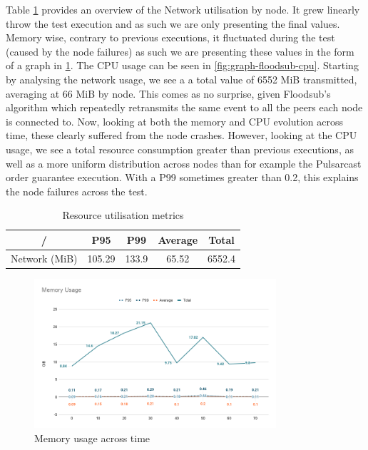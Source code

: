 Table \ref{table:floodsub} provides an overview of the Network utilisation by
node. It grew linearly throw the test execution and as such we are only
presenting the final values. Memory wise, contrary to previous executions, it
fluctuated during the test (caused by the node failures) as such we are
presenting these values in the form of a graph in
\ref{fig:graph-floodsub-memory}. The CPU usage can be seen in
\ref{fig:graph-floodsub-cpu}. Starting by analysing the network usage, we see a
a total value of 6552 MiB transmitted, averaging at 66 MiB by node. This comes
as no surprise, given Floodsub's algorithm which repeatedly retransmits the
same event to all the peers each node is connected to. Now, looking at both the
memory and CPU evolution across time, these clearly suffered from the node
crashes. However, looking at the CPU usage, we see a total resource consumption
greater than previous executions, as well as a more uniform distribution across
nodes than for example the Pulsarcast order guarantee execution. With a P99
sometimes greater than 0.2, this explains the node failures across the test.

\begin{table}[!htb]
\caption{Resource utilisation metrics}
\label{table:floodsub}
  \begin{center}
   \begin{tabular}{|c| c c c c|} 
   \hline
   / & P95 & P99 & Average & Total \\ [0.5ex] 
   \hline\hline
   Network (MiB) & 105.29 & 133.9 & 65.52 & 6552.4 \\
   \hline
  \end{tabular}
  \end{center}
\end{table}

\begin{figure}[!htb]
  \centering
  \includegraphics[width=0.8\textwidth]{img/graph-floodsub-memory.png}
  \caption{Memory usage across time}
  \label{fig:graph-floodsub-memory}
\end{figure}

